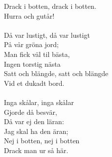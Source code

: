 Drack i botten, drack i botten.\\ 
Hurra och gutår!\\ 
 \\ 
\revrpt Då var lustigt, då var lustigt\\ 
På vår gröna jord;\rpt \\ 
Man fick väl til bästa,\\ 
Ingen torstig nästa\\ 
Satt och blängde, satt och blängde\\ 
Vid et dukadt bord.\\ 
 \\ 
\revrpt Inga skålar, inga skålar\\ 
Gjorde då besvär,\rpt \\ 
Då var ej den läran:\\ 
Jag skal ha den äran;\\ 
Nej i botten, nej i botten\\ 
Drack man ur så här.\\ 
